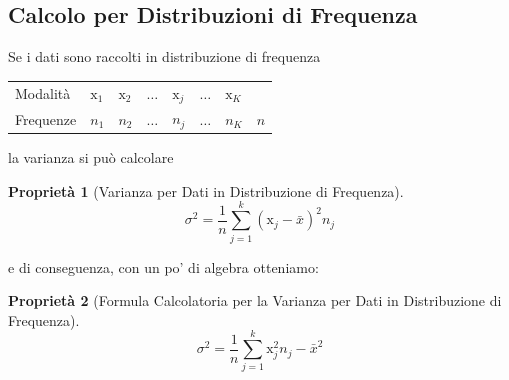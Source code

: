 \documentclass[
  11pt,
]{book}
\theoremstyle{mytheoremstyle}
\newtheorem{proposition}{Proprietà}[section]
\theoremstyle{mydefstyle}
\begin{document}
\subsection{Calcolo per Distribuzioni di Frequenza}\label{calcolo-per-distribuzioni-di-frequenza-1}

Se i dati sono raccolti in distribuzione di frequenza

\begin{tabular}[t]{lllllll|>{}l}
\toprule
Modalità & $\mathrm{x}_1$ & $\mathrm{x}_2$ & $\ldots$ & $\mathrm{x}_j$ & $\ldots$ & $\mathrm{x}_K$ & \\
Frequenze & $n_1$ & $n_2$ & $\ldots$ & $n_j$ & $\ldots$ & $n_K$ & $n$\\
\bottomrule
\end{tabular}

la varianza si può calcolare

\begin{info}

\begin{proposition}[Varianza per Dati in Distribuzione di Frequenza]
\[
\sigma^2=\frac 1 n\sum_{j=1}^k(\mathrm{x}_j-\bar x)^2n_j
\]
\end{proposition}

\end{info}

e di conseguenza, con un po' di algebra otteniamo:

\begin{info}

\begin{proposition}[Formula Calcolatoria per la Varianza per Dati in Distribuzione di Frequenza]
\[
\sigma^2=\frac 1 n\sum_{j=1}^k\mathrm{x}_j^2n_j-\bar x^2
\]
\end{proposition}

\end{info}
\end{document}
